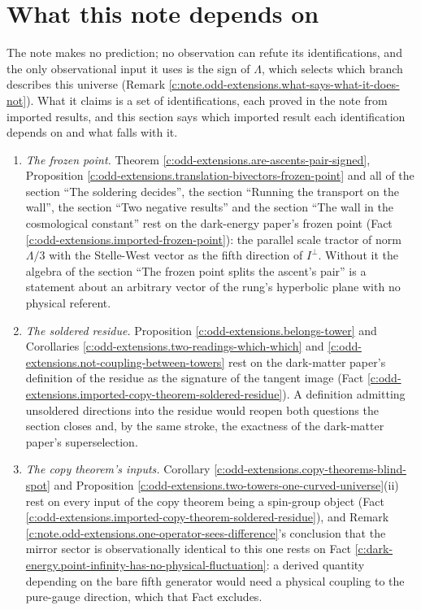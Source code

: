 \documentclass[11pt]{article}
\theoremstyle{definition}
\theoremstyle{plain}
\begin{document}
\section{What this note depends on}

\label{c:note.odd-extensions.setting-what-note-depends}
The note makes no prediction; no observation can refute its identifications, and the only observational input it uses is the sign of $\Lambda$, which selects which branch describes this universe (Remark \ref{c:note.odd-extensions.what-says-what-it-does-not}). What it claims is a set of identifications, each proved in the note from imported results, and this section says which imported result each identification depends on and what falls with it.
\begin{enumerate}
\item[(D1)] \emph{The frozen point.} Theorem \ref{c:odd-extensions.are-ascents-pair-signed}, Proposition \ref{c:odd-extensions.translation-bivectors-frozen-point} and all of the section ``The soldering decides'', the section ``Running the transport on the wall'', the section ``Two negative results'' and the section ``The wall in the cosmological constant'' rest on the dark-energy paper's frozen point (Fact \ref{c:odd-extensions.imported-frozen-point}): the parallel scale tractor of norm $\Lambda/3$ with the Stelle-West vector as the fifth direction of $I^{\perp}$. Without it the algebra of the section ``The frozen point splits the ascent's pair'' is a statement about an arbitrary vector of the rung's hyperbolic plane with no physical referent.
\item[(D2)] \emph{The soldered residue.} Proposition \ref{c:odd-extensions.belongs-tower} and Corollaries \ref{c:odd-extensions.two-readings-which-which} and \ref{c:odd-extensions.not-coupling-between-towers} rest on the dark-matter paper's definition of the residue as the signature of the tangent image (Fact \ref{c:odd-extensions.imported-copy-theorem-soldered-residue}). A definition admitting unsoldered directions into the residue would reopen both questions the section closes and, by the same stroke, the exactness of the dark-matter paper's superselection.
\item[(D3)] \emph{The copy theorem's inputs.} Corollary \ref{c:odd-extensions.copy-theorems-blind-spot} and Proposition \ref{c:odd-extensions.two-towers-one-curved-universe}(ii) rest on every input of the copy theorem being a spin-group object (Fact \ref{c:odd-extensions.imported-copy-theorem-soldered-residue}), and Remark \ref{c:note.odd-extensions.one-operator-sees-difference}'s conclusion that the mirror sector is observationally identical to this one rests on Fact \ref{c:dark-energy.point-infinity-has-no-physical-fluctuation}: a derived quantity depending on the bare fifth generator would need a physical coupling to the pure-gauge direction, which that Fact excludes.

\end{enumerate}
\end{document}
